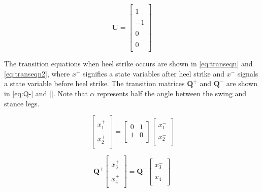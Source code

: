 \documentclass{./springer/svjour3}
\newcommand{\mb}[1]{\mathbf{#1}}
\begin{document}
\begin{equation}
\mb{U} = 
\label{eq:U2}
\begin{bmatrix}
\\1\\
\\-1\\
\\0\\
\\0\\
\end{bmatrix}
\end{equation}



The transition equations when heel strike occurs are shown in \ref{eq:transeqn} and \ref{eq:transeqn2}, where $x^+$ signifies a state variables after heel strike and $x^-$ 
signals a state variable before
heel strike. The transition matrices $\mb{Q^+}$ and $\mb{Q^-}$ are shown in \ref{eq:Q-} and \ref{}. Note that $\alpha$ represents half the angle between the swing and stance 
legs.

\begin{equation}
\label{eq:transeqn}
\begin{bmatrix}
\\x_1^+\\
\\x_2^+\\
\end{bmatrix}
 = 
\begin{bmatrix}
0 & 1\\
1 & 0\\
\end{bmatrix}
\begin{bmatrix}
\\x_1^-\\
\\x_2^-\\
\end{bmatrix}
\end{equation}

\begin{equation}
\label{eq:transeqn2}
\mb{Q^+}
\begin{bmatrix}
\\x_3^+\\
\\x_4^+\\
\end{bmatrix}
= 
\mb{Q^-}
\begin{bmatrix}
\\x_3^-\\
\\x_4^-\\
\end{bmatrix}
\end{equation}
\end{document}
